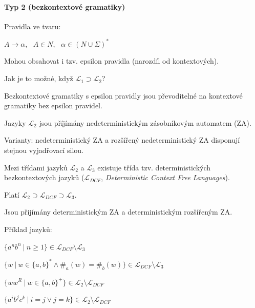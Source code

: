 \paragraph*{Typ 2 (bezkontextové gramatiky)} \begin{compactitem}
    \item Pravidla ve tvaru: \begin{compactitem}
        \item $A \rightarrow \alpha,~~~ A \in N,~~~ \alpha \in (N \cup \Sigma)^*$
        \item Mohou obsahovat i tzv. epsilon pravidla (narozdíl od kontextových).
        \item Jak je to možné, když $\mathcal{L}_1 \supset \mathcal{L}_2$?
        \item Bezkontextové gramatiky s epsilon pravidly jsou převoditelné na kontextové gramatiky bez epsilon pravidel.
    \end{compactitem}

    \item Jazyky $\mathcal{L}_2$ jsou příjímány nedeterministickým zásobníkovým automatem (ZA). \begin{compactitem}
        \item Varianty: nedeterministický ZA a rozšířený nedeterministický ZA disponují stejnou vyjadřovací silou.
    \end{compactitem}

    \item Mezi třídami jazyků $\mathcal{L}_2$ a $\mathcal{L}_3$ existuje třída tzv. deterministických bezkontextových jazyků ($\mathcal{L}_{DCF}$, \textit{Deterministic Context Free Languages}). \begin{compactitem}
        \item Platí $\mathcal{L}_2 \supset \mathcal{L}_{DCF} \supset \mathcal{L}_3$.
        \item Jsou přijímány deterministickým ZA a deterministickým rozšířeným ZA. 
    \end{compactitem}

    \item Příklad jazyků: \begin{compactitem}
        \item $\{ a^n b^n ~|~ n \geq 1 \} \in \mathcal{L}_{DCF} \setminus \mathcal{L}_3$

        \item $\{ w ~|~ w \in \{a, b\}^* \land \#_a(w) = \#_b(w) \} \in \mathcal{L}_{DCF} \setminus \mathcal{L}_3$

        \item $\{ ww^R ~|~ w \in \{a,b\}^+ \} \in \mathcal{L}_{2} \setminus \mathcal{L}_{DCF}$

        \item $\{ a^i b^j c^k ~|~ i = j \lor j = k \} \in \mathcal{L}_{2} \setminus \mathcal{L}_{DCF}$

    \end{compactitem}

\end{compactitem}

